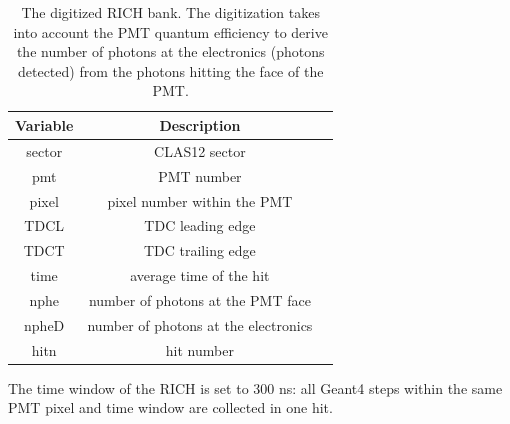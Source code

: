\begin{table}[h]
	\begin{center}
		\begin{tabular}{| c | c | c |}
			\hline \hline
			Variable & Description                                         \\
			\hline
             sector  &                                     CLAS12 sector   \\
                pmt  &                                        PMT number   \\
              pixel  &                       pixel number within the PMT   \\
               TDCL  &                                  TDC leading edge   \\
               TDCT  &                                 TDC trailing edge   \\
               time  &                           average time of the hit   \\
               nphe  &                 number of photons at the PMT face   \\
               npheD &              number of photons at the electronics   \\
               hitn  &                                        hit number   \\
			\hline \hline
		\end{tabular}
	\end{center}
	\caption{The digitized RICH bank. The digitization takes into account the PMT quantum efficiency
             to derive the number of photons at the electronics (photons detected) from the photons
             hitting the face of the PMT.}\label{tab:richBank}
\end{table}

The time window  of the RICH is set to 300 ns: all Geant4 steps within the same PMT pixel and time window are collected in one hit.

